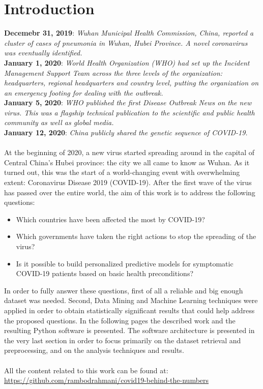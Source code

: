 \documentclass[11pt,a4paper]{article}
\begin{document}
\section{Introduction}
\textbf{Decemebr 31, 2019}: \textit{Wuhan Municipal Health Commission, China,
reported a cluster of cases of pneumonia in Wuhan, Hubei Province. A novel
coronavirus was eventually identified.}\\
\textbf{January 1, 2020}: \textit{World Health Organization (WHO) had set up the
Incident Management Support Team across the three levels of the organization:
headquarters, regional headquarters and country level, putting the organization
on an emergency footing for dealing with the outbreak.}\\
\textbf{January 5, 2020}: \textit{WHO published the first Disease Outbreak News
on the new virus. This was a flagship technical publication to the scientific
and public health community as well as global media.}\\
\textbf{January 12, 2020}: \textit{China publicly shared the genetic sequence of
COVID-19.}\\
\\
At the beginning of 2020, a new virus started spreading around in the capital of
Central China's Hubei province: the city we all came to know as Wuhan. As it
turned out, this was the start of a world-changing event with overwhelming
extent: Coronavirus Disease 2019 (COVID-19). After the first wave of the virus
has passed over the entire world, the aim of this work is to address the
following questions:
\begin{itemize}
	\item Which countries have been affected the most by COVID-19?
	\item Which governments have taken the right actions to stop the
		spreading of the virus?
	\item Is it possible to build personalized predictive models for
		symptomatic COVID-19 patients based on basic health preconditions?
\end{itemize}
In order to fully answer these questions, first of all a reliable and big enough
dataset was needed. Second, Data Mining and Machine Learning techniques were
applied in order to obtain statistically significant results that could help
address the proposed questions. In the following pages the described work and
the resulting Python software is presented. The software architecture is
presented in the very last section in order to focus primarily on the dataset
retrieval and preprocessing, and on the analysis techniques and results.\\
\\
All the content related to this work can be found at:
\url{https://github.com/rambodrahmani/covid19-behind-the-numbers}
\end{document}
